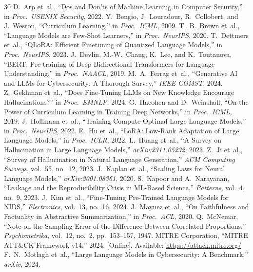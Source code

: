 \documentclass[review,3p]{elsarticle}
\begin{document}
\begin{thebibliography}{30}
 D.~Arp et~al., ``Dos and Don'ts of Machine Learning in Computer Security,'' in \emph{Proc.\ USENIX Security}, 2022.
 Y.~Bengio, J.~Louradour, R.~Collobert, and J.~Weston, ``Curriculum Learning,'' in \emph{Proc.\ ICML}, 2009.
 T.~B.~Brown et~al., ``Language Models are Few-Shot Learners,'' in \emph{Proc.\ NeurIPS}, 2020.
 T.~Dettmers et~al., ``QLoRA: Efficient Finetuning of Quantized Language Models,'' in \emph{Proc.\ NeurIPS}, 2023.
 J.~Devlin, M.-W.~Chang, K.~Lee, and K.~Toutanova, ``BERT: Pre-training of Deep Bidirectional Transformers for Language Understanding,'' in \emph{Proc.\ NAACL}, 2019.
 M.~A.~Ferrag et~al., ``Generative AI and LLMs for Cybersecurity: A Thorough Survey,'' \emph{IEEE COMST}, 2024.
 Z.~Gekhman et~al., ``Does Fine-Tuning LLMs on New Knowledge Encourage Hallucinations?'' in \emph{Proc.\ EMNLP}, 2024.
 G.~Hacohen and D.~Weinshall, ``On the Power of Curriculum Learning in Training Deep Networks,'' in \emph{Proc.\ ICML}, 2019.
 J.~Hoffmann et~al., ``Training Compute-Optimal Large Language Models,'' in \emph{Proc.\ NeurIPS}, 2022.
 E.~Hu et~al., ``LoRA: Low-Rank Adaptation of Large Language Models,'' in \emph{Proc.\ ICLR}, 2022.
 L.~Huang et~al., ``A Survey on Hallucination in Large Language Models,'' \emph{arXiv:2311.05232}, 2023.
 Z.~Ji et~al., ``Survey of Hallucination in Natural Language Generation,'' \emph{ACM Computing Surveys}, vol.~55, no.~12, 2023.
 J.~Kaplan et~al., ``Scaling Laws for Neural Language Models,'' \emph{arXiv:2001.08361}, 2020.
 S.~Kapoor and A.~Narayanan, ``Leakage and the Reproducibility Crisis in ML-Based Science,'' \emph{Patterns}, vol.~4, no.~9, 2023.
 J.~Kim et~al., ``Fine-Tuning Pre-Trained Language Models for NIDS,'' \emph{Electronics}, vol.~13, no.~16, 2024.
 J.~Maynez et~al., ``On Faithfulness and Factuality in Abstractive Summarization,'' in \emph{Proc.\ ACL}, 2020.
 Q.~McNemar, ``Note on the Sampling Error of the Difference Between Correlated Proportions,'' \emph{Psychometrika}, vol.~12, no.~2, pp.~153--157, 1947.
 MITRE Corporation, ``MITRE ATT\&CK Framework v14,'' 2024. [Online]. Available: \url{https://attack.mitre.org/}
 F.~N.~Motlagh et~al., ``Large Language Models in Cybersecurity: A Benchmark,'' \emph{arXiv}, 2024.

\end{thebibliography}
\end{document}
